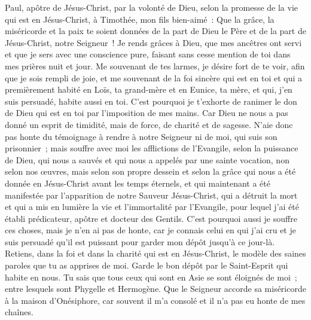 \begin{multicols}{2}
\VerseOne{}Paul, apôtre de Jésus-Christ, par la volonté de Dieu, selon la promesse de la vie qui est en Jésus-Christ,
à Timothée, mon fils bien-aimé~: Que la grâce, la miséricorde et la paix te soient données de la part de Dieu le Père et de la part de Jésus-Christ, notre Seigneur~!
Je rends grâces à Dieu, que mes ancêtres ont servi et que je sers avec une conscience pure, faisant sans cesse mention de toi dans mes prières nuit et jour.
Me souvenant de tes larmes, je désire fort de te voir, afin que je sois rempli de joie,
et me souvenant de la foi sincère qui est en toi et qui a premièrement habité en Loïs, ta grand-mère et en Eunice, ta mère, et qui, j'en suis persuadé, habite aussi en toi.
C'est pourquoi je t'exhorte de ranimer le don de Dieu qui est en toi par l'imposition de mes mains.
Car Dieu ne nous a pas donné un esprit de timidité, mais de force, de charité et de sagesse.
N'aie donc pas honte du témoignage à rendre à notre Seigneur ni de moi, qui suis son prisonnier~; mais souffre avec moi les afflictions de l'Evangile, selon la puissance de Dieu,
qui nous a sauvés et qui nous a appelés par une sainte vocation, non selon nos œuvres, mais selon son propre dessein et selon la grâce qui nous a été donnée en Jésus-Christ avant les temps éternels,
et qui maintenant a été manifestée par l'apparition de notre Sauveur Jésus-Christ, qui a détruit la mort et qui a mis en lumière la vie et l'immortalité par l'Evangile,
pour lequel j'ai été établi prédicateur, apôtre et docteur des Gentils.
C'est pourquoi aussi je souffre ces choses, mais je n'en ai pas de honte, car je connais celui en qui j'ai cru et je suis persuadé qu'il est puissant pour garder mon dépôt jusqu'à ce jour-là.
Retiens, dans la foi et dans la charité qui est en Jésus-Christ, le modèle des saines paroles que tu as apprises de moi.
Garde le bon dépôt par le Saint-Esprit qui habite en nous.
Tu sais que tous ceux qui sont en Asie se sont éloignés de moi~; entre lesquels sont Phygelle et Hermogène.
Que le Seigneur accorde sa miséricorde à la maison d'Onésiphore, car souvent il m'a consolé et il n'a pas eu honte de mes chaînes.

\end{multicols}

